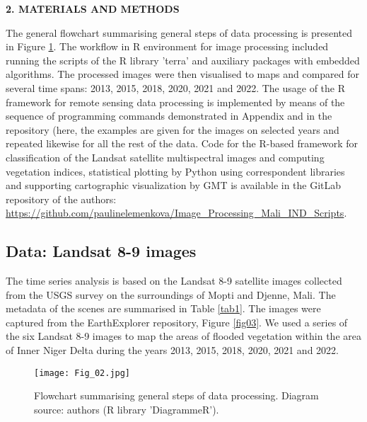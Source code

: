 \documentclass[12pt,a4paper,oneside]{article}
\def \newsection{\vspace{12pt}\textbf}
\def \newpar{\vspace{6pt}}
\begin{document}
\newsection {2. MATERIALS AND METHODS}

The general flowchart summarising general steps of data processing is presented in Figure \ref{fig02}. The workflow in R environment for image processing included running the scripts of the R library 'terra' and auxiliary packages with embedded algorithms. The processed images were then visualised to maps and compared for several time spans: 2013, 2015, 2018, 2020, 2021 and 2022. The usage of the R framework for remote sensing data processing is implemented by means of the sequence of programming commands demonstrated in Appendix and in the repository (here, the examples are given for the images on selected years and repeated likewise for all the rest of the data. Code for the R-based framework for classification of the Landsat satellite multispectral images and computing vegetation indices, statistical plotting by Python using correspondent libraries and supporting cartographic visualization by GMT is available in the GitLab repository of the authors: \href{https://github.com/paulinelemenkova/Image_Processing_Mali_IND_Scripts}{https://github.com/paulinelemenkova/Image\_Processing\_Mali\_IND\_Scripts}.

\subsection*{Data: Landsat 8-9 images}

\newpar The time series analysis is based on the Landsat 8-9 satellite images collected from the USGS survey \citep{Landsat9} on the surroundings of Mopti and Djenne, Mali. The metadata of the scenes are summarised in Table \ref{tab1}. The images were captured from the EarthExplorer repository, Figure \ref{fig03}. We used a series of the six Landsat 8-9 images to map the areas of flooded vegetation within the area of Inner Niger Delta during the years 2013, 2015, 2018, 2020, 2021 and 2022. 

\begin{figure}[H]
\centering
	\texttt{[image: Fig\_02.jpg]}
	\vspace*{20pt}\caption{Flowchart summarising general steps of data processing. Diagram source: authors (R library 'DiagrammeR').
	\label{fig02}}
\end{figure}
\end{document}
